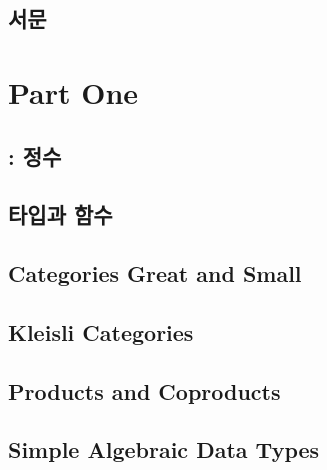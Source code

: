 


\frontmatter
\tableofcontents


\chapter*{서문}
\label{서문}


\mainmatter

\part*{Part One}

\chapter{\trCategory:  정수}\label{category-the-essence-of-composition}


\chapter{타입과 함수}\label{타입과 함수}


\chapter{Categories Great and Small}\label{categories-great-and-small}


\chapter{Kleisli Categories}\label{kleisli-categories}


\chapter{Products and Coproducts}\label{products-and-coproducts}


\chapter{Simple Algebraic Data Types}\label{simple-algebraic-data-types}


